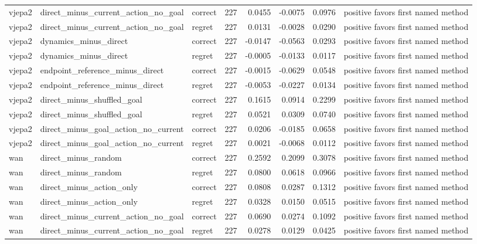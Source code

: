 \begin{tabular}{lllrrrrl}
vjepa2 & direct\_minus\_current\_action\_no\_goal & correct & 227 & 0.0455 & -0.0075 & 0.0976 & positive favors first named method \\
vjepa2 & direct\_minus\_current\_action\_no\_goal & regret & 227 & 0.0131 & -0.0028 & 0.0290 & positive favors first named method \\
vjepa2 & dynamics\_minus\_direct & correct & 227 & -0.0147 & -0.0563 & 0.0293 & positive favors first named method \\
vjepa2 & dynamics\_minus\_direct & regret & 227 & -0.0005 & -0.0133 & 0.0117 & positive favors first named method \\
vjepa2 & endpoint\_reference\_minus\_direct & correct & 227 & -0.0015 & -0.0629 & 0.0548 & positive favors first named method \\
vjepa2 & endpoint\_reference\_minus\_direct & regret & 227 & -0.0053 & -0.0227 & 0.0134 & positive favors first named method \\
vjepa2 & direct\_minus\_shuffled\_goal & correct & 227 & 0.1615 & 0.0914 & 0.2299 & positive favors first named method \\
vjepa2 & direct\_minus\_shuffled\_goal & regret & 227 & 0.0521 & 0.0309 & 0.0740 & positive favors first named method \\
vjepa2 & direct\_minus\_goal\_action\_no\_current & correct & 227 & 0.0206 & -0.0185 & 0.0658 & positive favors first named method \\
vjepa2 & direct\_minus\_goal\_action\_no\_current & regret & 227 & 0.0021 & -0.0068 & 0.0112 & positive favors first named method \\
wan & direct\_minus\_random & correct & 227 & 0.2592 & 0.2099 & 0.3078 & positive favors first named method \\
wan & direct\_minus\_random & regret & 227 & 0.0800 & 0.0618 & 0.0966 & positive favors first named method \\
wan & direct\_minus\_action\_only & correct & 227 & 0.0808 & 0.0287 & 0.1312 & positive favors first named method \\
wan & direct\_minus\_action\_only & regret & 227 & 0.0328 & 0.0150 & 0.0515 & positive favors first named method \\
wan & direct\_minus\_current\_action\_no\_goal & correct & 227 & 0.0690 & 0.0274 & 0.1092 & positive favors first named method \\
wan & direct\_minus\_current\_action\_no\_goal & regret & 227 & 0.0278 & 0.0129 & 0.0425 & positive favors first named method \\

\end{tabular}
